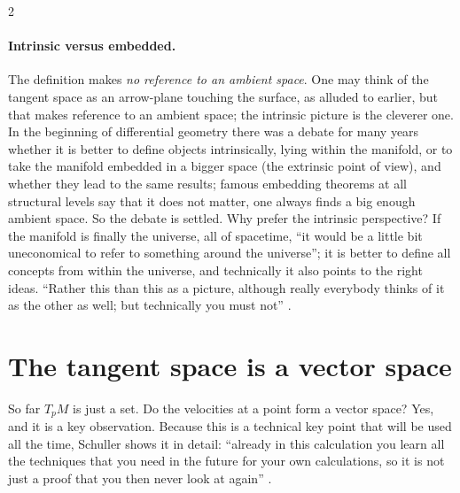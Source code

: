 \begin{paracol}{2}
\paragraph{Intrinsic versus embedded.} The definition makes \emph{no reference to an ambient space}. One may think of the tangent space as an arrow-plane touching the surface, as alluded to earlier, but that makes reference to an ambient space; the intrinsic picture is the cleverer one. In the beginning of differential geometry there was a debate for many years whether it is better to define objects
intrinsically, lying within the manifold, or to take the manifold embedded in a bigger space (the extrinsic point of view), and whether they lead to the same results; famous embedding theorems at all structural levels say that it does not matter, one always finds a big enough ambient space. So the debate is settled. Why prefer the intrinsic perspective?
If the manifold is finally the universe, all of spacetime, ``it would be a little bit uneconomical to refer to something around the universe''; it is better to define all concepts from within the universe, and technically it also points to the right ideas. ``Rather this than this as a picture, although really everybody thinks of it as the other as well; but technically you must not''
.

\section{The tangent space is a vector space}\label{sec:c05-vs}

So far $T_pM$ is just a set. Do the velocities at a point form a vector space? Yes, and it is a key observation. Because this is a technical key point that will be used all the time, Schuller shows it in detail: ``already in this calculation you learn all the techniques that you need in the future for your own calculations, so it is not just a proof that you then never look at again''
.


\end{paracol}
